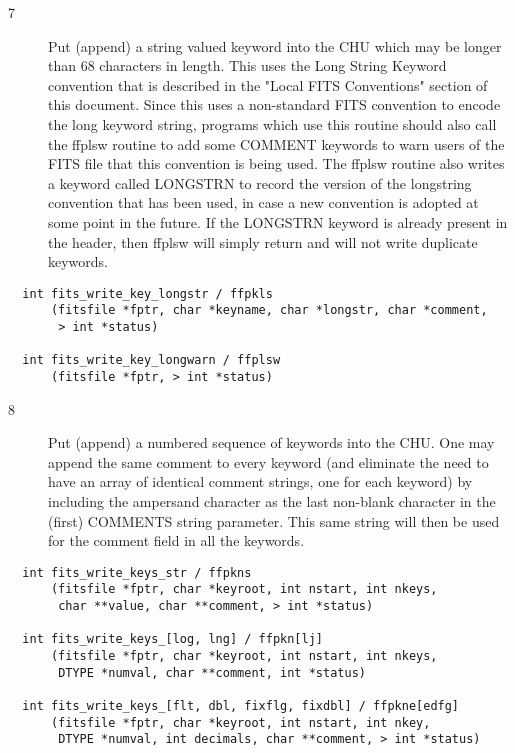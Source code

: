 \begin{description}
\item[7 ] Put (append) a string valued keyword into the CHU which may be longer
    than 68 characters in length.  This uses the Long String Keyword
    convention that is described in the "Local FITS Conventions"
    section of this document.  Since this uses a non-standard FITS
    convention to encode the long keyword string, programs which use
    this routine should also call the ffplsw routine to add some COMMENT
    keywords to warn users of the FITS file that this convention is
    being used.  The ffplsw routine also writes a keyword called LONGSTRN to
    record the version of the longstring convention that has been used, in
    case a new convention is adopted at some point in the future.   If the
    LONGSTRN keyword is already present in the header, then ffplsw will
   simply return and will not write duplicate keywords.
\end{description}

\begin{verbatim}
  int fits_write_key_longstr / ffpkls
      (fitsfile *fptr, char *keyname, char *longstr, char *comment,
       > int *status)

  int fits_write_key_longwarn / ffplsw
      (fitsfile *fptr, > int *status)
\end{verbatim}

\begin{description}
\item[8 ] Put (append) a numbered sequence of keywords into the CHU.   One may
    append the same comment to every keyword (and eliminate the need
    to have an array of identical comment strings, one for each keyword) by
    including the ampersand character as the last non-blank character in the
    (first) COMMENTS string parameter.  This same string
   will then be used for the comment field in all the keywords.
\end{description}

\begin{verbatim}
  int fits_write_keys_str / ffpkns
      (fitsfile *fptr, char *keyroot, int nstart, int nkeys,
       char **value, char **comment, > int *status)

  int fits_write_keys_[log, lng] / ffpkn[lj]
      (fitsfile *fptr, char *keyroot, int nstart, int nkeys,
       DTYPE *numval, char **comment, int *status)

  int fits_write_keys_[flt, dbl, fixflg, fixdbl] / ffpkne[edfg]
      (fitsfile *fptr, char *keyroot, int nstart, int nkey,
       DTYPE *numval, int decimals, char **comment, > int *status)
\end{verbatim}

